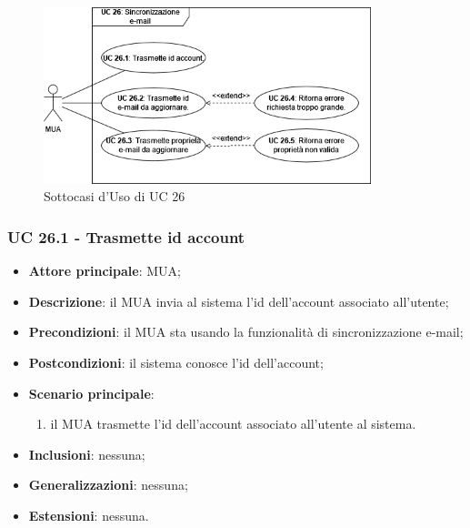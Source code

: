     \begin{figure}[H]
        \includegraphics[width=0.85\textwidth]{sections/uc_imgs/UC26.png}
        \centering
        \caption{Sottocasi d'Uso di UC 26}
    \end{figure}

    \subsubsection{UC 26.1 - Trasmette id account} \label{sec:UC26.1}
    \begin{itemize}
        \item \textbf{Attore principale}: MUA;
        \item \textbf{Descrizione}: il MUA invia al sistema l'id dell'account associato all'utente;
        \item \textbf{Precondizioni}: il MUA sta usando la funzionalità di sincronizzazione e-mail;
        \item \textbf{Postcondizioni}: il sistema conosce l'id dell'account;
        \item \textbf{Scenario principale}:
            \begin{enumerate}
                \item il MUA trasmette l'id dell'account associato all'utente al sistema.
            \end{enumerate}
        \item \textbf{Inclusioni}: nessuna;
        \item \textbf{Generalizzazioni}: nessuna;
        \item \textbf{Estensioni}: nessuna.
    \end{itemize}

